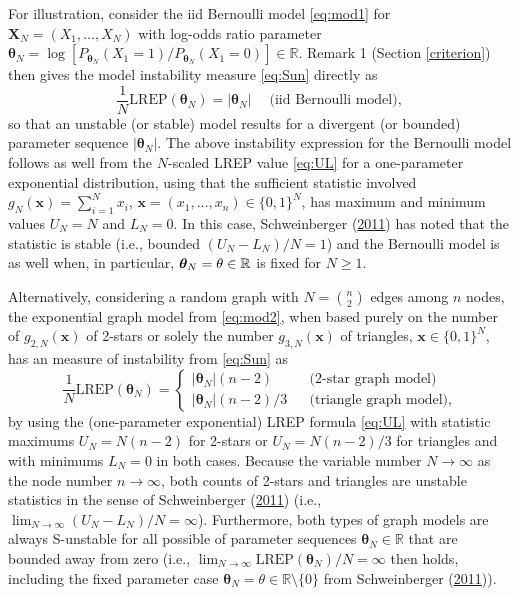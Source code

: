 \documentclass[]{article}
\theoremstyle{definition}
\newcommand{\REP}{\mathrm{LREP}}
\begin{document}
For illustration, consider the iid Bernoulli model \eqref{eq:mod1} for
\(\boldsymbol X_N=(X_1,\ldots,X_N)\) with log-odds ratio parameter
\(\boldsymbol \theta_N = \log[ P_{\boldsymbol \theta_N}(X_1=1)/ P_{\boldsymbol \theta_N}(X_1=0)]\in\mathbb{R}\).
Remark 1 (Section \ref{criterion}) then gives the model instability
measure \eqref{eq:Sun} directly as \[
\frac{1}{N}\REP(\boldsymbol \theta_N ) = |\boldsymbol \theta_N|\quad\; \text{(iid Bernoulli model)},
\] so that an unstable (or stable) model results for a divergent (or
bounded) parameter sequence \(|\boldsymbol \theta_N|\). The above
instability expression for the Bernoulli model follows as well from the
\(N\)-scaled LREP value \eqref{eq:UL} for a one-parameter exponential
distribution, using that the sufficient statistic involved
\(g_N(\boldsymbol x)= \sum_{i=1}^N x_i\),
\(\boldsymbol x =(x_1,\ldots,x_n)\in\{0,1\}^N\), has maximum and minimum
values \(U_N=N\) and \(L_N=0\). In this case, Schweinberger
(\protect\hyperlink{ref-schweinberger2011instability}{2011}) has noted
that the statistic is stable (i.e., bounded \((U_N-L_N)/N=1\)) and the
Bernoulli model is as well when, in particular,
\(\boldsymbol \theta_N=\bold \theta \in\mathbb{R}\) is fixed for
\(N \geq 1\).

Alternatively, considering a random graph with \(N={n \choose 2}\) edges
among \(n\) nodes, the exponential graph model from \eqref{eq:mod2}, when
based purely on the number of \(g_{2,N}(\boldsymbol x)\) of 2-stars or
solely the number \(g_{3,N}(\boldsymbol x)\) of triangles,
\(\boldsymbol x\in\{0,1\}^N\), has an measure of instability from
\eqref{eq:Sun} as \[
\frac{1}{N}\REP(\boldsymbol \theta_N )  = \left\{ \begin{array}{lcl} |\boldsymbol \theta_N| (n-2) && \text{(2-star graph model)}\\
|\boldsymbol \theta_N|(n-2)/3 &&\text{(triangle graph model)},\end{array}\right.
\] by using the (one-parameter exponential) LREP formula \eqref{eq:UL}
with statistic maximums \(U_N= N(n-2)\) for 2-stars or \(U_N= N(n-2)/3\)
for triangles and with minimums \(L_N=0\) in both cases. Because the
variable number \(N\to \infty\) as the node number \(n\to \infty\), both
counts of 2-stars and triangles are unstable statistics in the sense of
Schweinberger
(\protect\hyperlink{ref-schweinberger2011instability}{2011}) (i.e.,
\(\lim_{N\to \infty} (U_N-L_N)/N=\infty\)). Furthermore, both types of
graph models are always S-unstable for all possible of parameter
sequences \(\boldsymbol \theta_N \in\mathbb{R}\) that are bounded away
from zero (i.e.,
\(\lim_{N\to \infty}\REP(\boldsymbol \theta_N )/N=\infty\) then holds,
including the fixed parameter case
\(\boldsymbol \theta_N=\theta\in\mathbb{R}\setminus \{0\}\) from
Schweinberger
(\protect\hyperlink{ref-schweinberger2011instability}{2011})).
\end{document}
